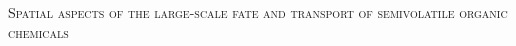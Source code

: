 \documentclass[a5paper]{article}
\begin{document}
\LARGE
\pagestyle{empty}
\begin{center}
\textsc{Spatial aspects of the large-scale fate and transport of semivolatile organic chemicals}
\end{center}
\end{document}
